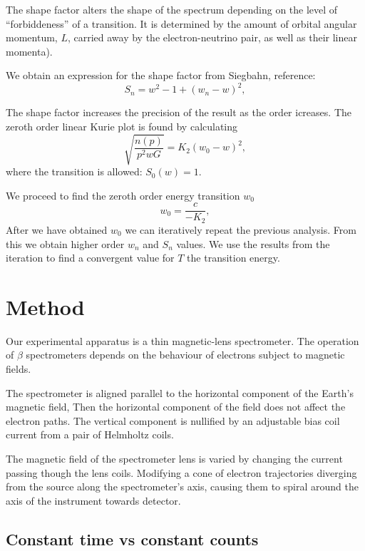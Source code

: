 \documentclass[9pt, a4paper]{article}
\begin{document}
\begin{multicols}{2}
The shape factor alters the shape of the spectrum depending on the level of “forbiddeness” of a transition. It is determined by the amount of orbital angular momentum, $L$, carried away by the electron-neutrino pair, as well as their linear momenta)\cite{NERS312}.

We obtain an expression for the shape factor from Siegbahn, reference\cite{Siegbahn}:
\begin{equation} S_n = w^2 - 1 + (w_n - w)^2,
\end{equation} 

The shape factor increases the precision of the result as the order icreases. The zeroth order linear Kurie plot is found by calculating
\begin{equation} \sqrt{\frac{n(p)}{p^2 w G}}= K_2 (w_0 - w)^2,
\end{equation}
where the transition is allowed: $S_0(w) = 1.$

We proceed to find the zeroth order energy transition $w_0$ 
\begin{equation} w_0 = \frac{c}{-K_2},
\end{equation}
After we have obtained $w_0$ we can iteratively repeat the previous analysis. 
From this we obtain higher order $w_n$ and $S_n$ values. We use the results from the iteration to find a convergent value for $T$ the transition energy.

\section{Method}

Our experimental apparatus is a thin magnetic-lens spectrometer. 
The operation of $\beta$ spectrometers depends on the behaviour of electrons subject to magnetic fields. 

The spectrometer is aligned parallel to the horizontal component of the Earth's magnetic field, Then the horizontal component of the field does not affect the electron paths. The vertical component is nullified by an adjustable bias coil current from a pair of Helmholtz coils.

The magnetic field of the spectrometer lens is varied by changing the current passing though the lens coils.
Modifying a cone of electron trajectories diverging from the source along the spectrometer's axis, causing them to spiral around the axis of the instrument towards detector\cite{SPA}. 

\subsection{Constant time vs constant counts}


\end{multicols}
\end{document}
